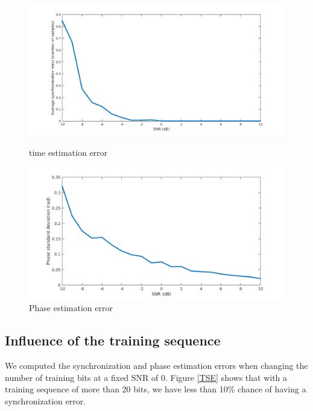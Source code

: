 \documentclass[a4paper,12pt]{article}
\begin{document}
\begin{figure}[ht]
\begin{minipage}[c]{.45\linewidth}
\begin{center}
\includegraphics[scale=0.35]{SynError.png}
\caption{time estimation error}
\label{SE}
\end{center}
\end{minipage}
\hfill
\begin{minipage}[c]{.45\linewidth}
\begin{center}
\includegraphics[scale=0.35]{PhaseError.png}
\caption{Phase estimation error}
\label{PE}
\end{center}
\end{minipage}
\end{figure}

\subsection{Influence of the training sequence}
We computed the synchronization and phase estimation errors when changing the number of training bits at a fixed SNR of 0. Figure \ref{TSE} shows that with a training sequence of more than 20 bits, we have less than 10\% chance of having a synchronization error.\\
\end{document}
